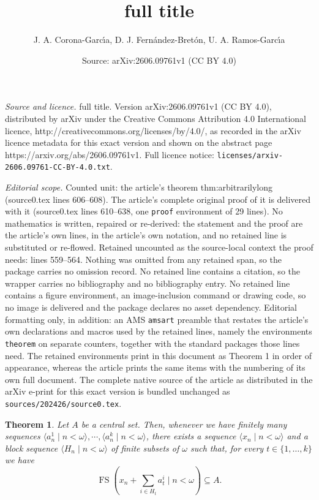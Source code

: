 \documentclass[10pt,a4paper]{amsart}
\title{full title}
\author{J. A. Corona-Garc\'{\i}a, D. J. Fern\'{a}ndez-Bret\'{o}n, U. A. Ramos-Garc\'{\i}a}
\date{Source: arXiv:2606.09761v1 (CC BY 4.0)}
\newtheorem{theorem}{Theorem}
\newcommand{\fs}{\mathop{\mathrm{FS}}}
\begin{document}
\maketitle

\noindent\emph{Source and licence.} full title. Version arXiv:2606.09761v1 (CC BY 4.0), distributed by arXiv under the Creative Commons Attribution 4.0 International licence, http://creativecommons.org/licenses/by/4.0/, as recorded in the arXiv licence metadata for this exact version and shown on the abstract page https://arxiv.org/abs/2606.09761v1. Full licence notice: \texttt{licenses/arxiv-2606.09761-CC-BY-4.0.txt}.\par\smallskip

\noindent\textit{Editorial scope.} Counted unit: the article's theorem thm:arbitrarilylong (source0.tex lines 606--608). The article's complete original proof of it is delivered with it (source0.tex lines 610--638, one \texttt{proof} environment of 29 lines). No mathematics is written, repaired or re-derived: the statement and the proof are the article's own lines, in the article's own notation, and no retained line is substituted or re-flowed.  Retained uncounted as the source-local context the proof needs: lines 559--564.  Nothing was omitted from any retained span, so the package carries no omission record.  No retained line contains a citation, so the wrapper carries no bibliography and no bibliography entry.  No retained line contains a figure environment, an image-inclusion command or drawing code, so no image is delivered and the package declares no asset dependency.  Editorial formatting only, in addition: an AMS \texttt{amsart} preamble that restates the article's own declarations and macros used by the retained lines, namely the environments \texttt{theorem} on separate counters, together with the standard packages those lines need.  The retained environments print in this document as Theorem 1 in order of appearance, whereas the article prints the same items with the numbering of its own full document.  The complete native source of the article as distributed in the arXiv e-print for this exact version is bundled unchanged as \texttt{sources/202426/source0.tex}.
\begin{theorem}\label{thm:centralsets}
    Let $A$ be a central set. Then, whenever we have finitely many sequences $\langle a_n^1\mid n<\omega\rangle,\cdots,\langle a_n^k\mid n<\omega\rangle$, there exists a sequence $\langle x_n\mid n<\omega\rangle$ and a block sequence $\langle H_n\mid n<\omega\rangle$ of finite subsets of $\omega$ such that, for every $t\in\{1,\ldots,k\}$ we have
    \begin{equation*}
        \fs\left(x_n+\sum_{i\in H_t}a_t^i\mid n<\omega\right)\subseteq A.
    \end{equation*}
\end{theorem}
\end{document}
